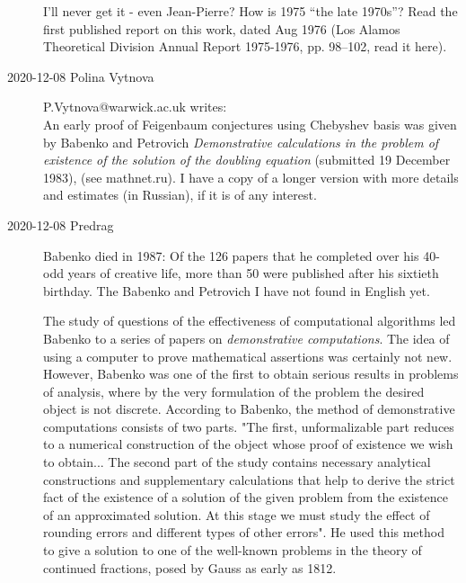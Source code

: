 \begin{description}
I'll never get it - even Jean-Pierre? How is 1975 ``the late 1970s''?
Read the first published report on this work, dated Aug 1976 (Los Alamos
Theoretical Division Annual Report 1975-1976, pp. 98--102,
 {read it here}).


\item[2020-12-08 Polina Vytnova] P.Vytnova@warwick.ac.uk writes:\\
An early proof of Feigenbaum conjectures using Chebyshev basis was given by
Babenko and Petrovich {\em Demonstrative calculations in the
problem of existence of the solution of the doubling equation}
(submitted 19 December 1983),
{(see mathnet.ru)}.
I have a copy of a longer version with more details and estimates (in
Russian), if it is of any interest.

\item[2020-12-08 Predrag]
{Babenko died in 1987}: Of  the 126  papers  that  he  completed  over
his  40-odd  years  of  creative  life,  more than  50  were  published
after  his  sixtieth  birthday. The Babenko and Petrovich
I have not found in English yet.

The  study  of  questions  of  the  effectiveness   of  computational
algorithms led  Babenko  to  a  series  of  papers  on  \emph{demonstrative
computations}.   The idea  of  using  a  computer  to  prove
mathematical  assertions  was  certainly  not new.    However,  Babenko
was  one  of  the  first  to  obtain  serious  results  in problems  of
analysis,  where  by  the  very  formulation  of  the  problem
the desired  object  is  not  discrete. According  to  Babenko,   the
method  of  demonstrative  computations consists  of  two  parts.   "The
first,  unformalizable  part  reduces  to  a  numerical construction  of
the  object  whose  proof  of  existence  we  wish  to  obtain... The
second  part  of  the  study  contains  necessary  analytical
constructions  and supplementary  calculations  that  help  to  derive
the  strict  fact  of  the  existence of  a  solution  of  the  given
problem  from  the  existence  of  an  approximated solution.    At  this
stage  we  must  study  the  effect   of  rounding  errors  and different
types  of  other  errors". He  used
this  method  to  give  a  solution  to one  of  the  well-known  problems
in  the  theory  of  continued  fractions,  posed by  Gauss  as  early  as
1812.


\end{description}
